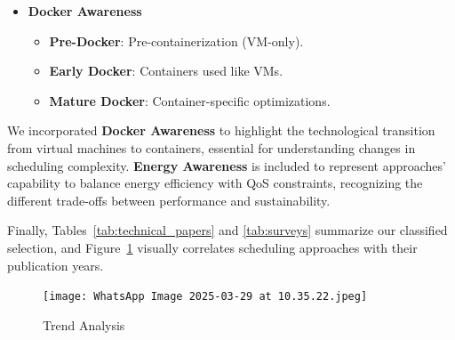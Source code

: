 \begin{multicols}{2}
\begin{itemize}
  \item \textbf{Docker Awareness}
    \begin{itemize}
      \item \textbf{Pre-Docker}: Pre-containerization (VM-only).
      \item \textbf{Early Docker}: Containers used like VMs.
      \item \textbf{Mature Docker}: Container-specific optimizations.
    \end{itemize}
\end{itemize}

We incorporated \textbf{Docker Awareness} to highlight the technological transition from virtual machines to containers, essential for understanding changes in scheduling complexity. \textbf{Energy Awareness} is included to represent approaches' capability to balance energy efficiency with QoS constraints, recognizing the different trade-offs between performance and sustainability.

Finally, Tables~\ref{tab:technical_papers} and \ref{tab:surveys} summarize our classified selection, and Figure~\ref{fig:trend_analysis} visually correlates scheduling approaches with their publication years.

\begin{figure}[H]
    \centering
    \texttt{[image: WhatsApp Image 2025-03-29 at 10.35.22.jpeg]}
    \caption{Trend Analysis}
    \label{fig:trend_analysis}
\end{figure}

\end{multicols}

